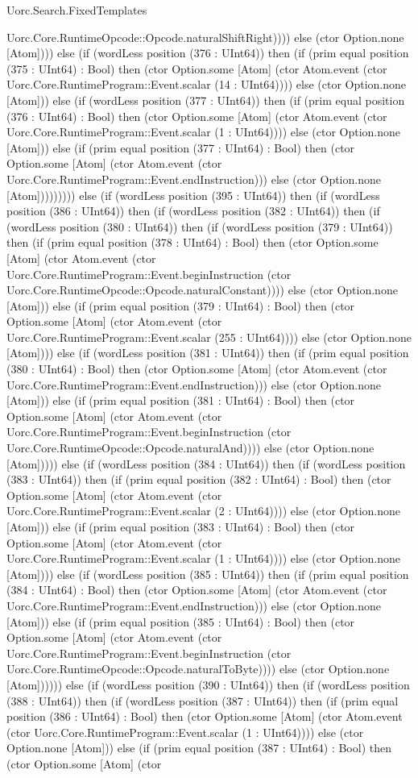 \begin{lexlean}{Uorc.Search.FixedTemplates}
\begin{semanticmodule}
{Uorc.Core.RuntimeOpcode::Opcode.naturalShiftRight)))) else (ctor Option.none [Atom]))) else (if (wordLess position (376 : UInt64)) then (if (prim equal position (375 : UInt64) : Bool) then (ctor Option.some [Atom] (ctor Atom.event (ctor Uorc.Core.RuntimeProgram::Event.scalar (14 : UInt64)))) else (ctor Option.none [Atom])) else (if (wordLess position (377 : UInt64)) then (if (prim equal position (376 : UInt64) : Bool) then (ctor Option.some [Atom] (ctor Atom.event (ctor Uorc.Core.RuntimeProgram::Event.scalar (1 : UInt64)))) else (ctor Option.none [Atom])) else (if (prim equal position (377 : UInt64) : Bool) then (ctor Option.some [Atom] (ctor Atom.event (ctor Uorc.Core.RuntimeProgram::Event.endInstruction))) else (ctor Option.none [Atom])))))))) else (if (wordLess position (395 : UInt64)) then (if (wordLess position (386 : UInt64)) then (if (wordLess position (382 : UInt64)) then (if (wordLess position (380 : UInt64)) then (if (wordLess position (379 : UInt64)) then (if (prim equal position (378 : UInt64) : Bool) then (ctor Option.some [Atom] (ctor Atom.event (ctor Uorc.Core.RuntimeProgram::Event.beginInstruction (ctor Uorc.Core.RuntimeOpcode::Opcode.naturalConstant)))) else (ctor Option.none [Atom])) else (if (prim equal position (379 : UInt64) : Bool) then (ctor Option.some [Atom] (ctor Atom.event (ctor Uorc.Core.RuntimeProgram::Event.scalar (255 : UInt64)))) else (ctor Option.none [Atom]))) else (if (wordLess position (381 : UInt64)) then (if (prim equal position (380 : UInt64) : Bool) then (ctor Option.some [Atom] (ctor Atom.event (ctor Uorc.Core.RuntimeProgram::Event.endInstruction))) else (ctor Option.none [Atom])) else (if (prim equal position (381 : UInt64) : Bool) then (ctor Option.some [Atom] (ctor Atom.event (ctor Uorc.Core.RuntimeProgram::Event.beginInstruction (ctor Uorc.Core.RuntimeOpcode::Opcode.naturalAnd)))) else (ctor Option.none [Atom])))) else (if (wordLess position (384 : UInt64)) then (if (wordLess position (383 : UInt64)) then (if (prim equal position (382 : UInt64) : Bool) then (ctor Option.some [Atom] (ctor Atom.event (ctor Uorc.Core.RuntimeProgram::Event.scalar (2 : UInt64)))) else (ctor Option.none [Atom])) else (if (prim equal position (383 : UInt64) : Bool) then (ctor Option.some [Atom] (ctor Atom.event (ctor Uorc.Core.RuntimeProgram::Event.scalar (1 : UInt64)))) else (ctor Option.none [Atom]))) else (if (wordLess position (385 : UInt64)) then (if (prim equal position (384 : UInt64) : Bool) then (ctor Option.some [Atom] (ctor Atom.event (ctor Uorc.Core.RuntimeProgram::Event.endInstruction))) else (ctor Option.none [Atom])) else (if (prim equal position (385 : UInt64) : Bool) then (ctor Option.some [Atom] (ctor Atom.event (ctor Uorc.Core.RuntimeProgram::Event.beginInstruction (ctor Uorc.Core.RuntimeOpcode::Opcode.naturalToByte)))) else (ctor Option.none [Atom]))))) else (if (wordLess position (390 : UInt64)) then (if (wordLess position (388 : UInt64)) then (if (wordLess position (387 : UInt64)) then (if (prim equal position (386 : UInt64) : Bool) then (ctor Option.some [Atom] (ctor Atom.event (ctor Uorc.Core.RuntimeProgram::Event.scalar (1 : UInt64)))) else (ctor Option.none [Atom])) else (if (prim equal position (387 : UInt64) : Bool) then (ctor Option.some [Atom] (ctor }
\end{semanticmodule}
\end{lexlean}

